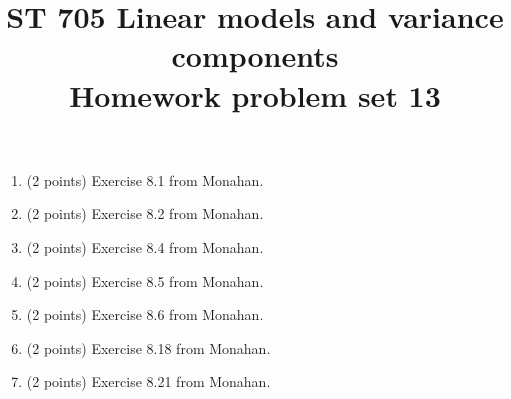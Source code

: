 \documentclass[11pt]{article}
\title{ST 705 Linear models and variance components \\ 
        Homework problem set 13}
\begin{document}
\maketitle

\begin{enumerate}

\item(2 points) Exercise 8.1 from Monahan.

\item(2 points) Exercise 8.2 from Monahan.

\item(2 points) Exercise 8.4 from Monahan.

\item(2 points) Exercise 8.5 from Monahan.

\item(2 points) Exercise 8.6 from Monahan.

\item(2 points) Exercise 8.18 from Monahan.

\item(2 points) Exercise 8.21 from Monahan.

\end{enumerate}
\end{document}
